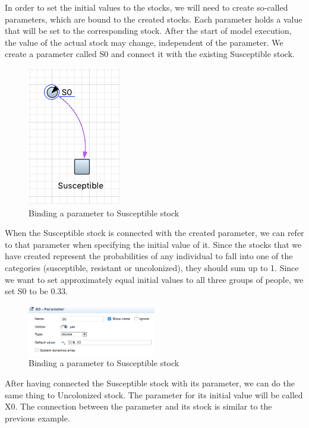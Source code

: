 In order to set the initial values to the stocks, we will need to create so-called parameters, which are bound to the created stocks. Each parameter holds a value that will be set to the corresponding stock. After the start of model execution, the value of the actual stock may change, independent of the parameter. We create a parameter called S0 and connect it with the existing Susceptible stock.

\begin{figure}[!ht]
  \centering
  \includegraphics[height=0.3\textwidth]{img/screens/basic/basic8}
  \caption{Binding a parameter to Susceptible stock}
\end{figure}

When the Susceptible stock is connected with the created parameter, we can refer to that parameter when specifying the initial value of it. Since the stocks that we have created represent the probabilities of any individual to fall into one of the categories (susceptible, resistant or uncolonized), they should sum up to 1. Since we want to set approximately equal initial values to all three groups of people, we set S0 to be 0.33.

\begin{figure}[!ht]
  \centering
  \includegraphics[width=0.5\textwidth]{img/screens/basic/basic7}
  \caption{Binding a parameter to Susceptible stock}
\end{figure}

After having connected the Susceptible stock with its parameter, we can do the same thing to Uncolonized stock. The parameter for its initial value will be called X0. The connection between the parameter and its stock is similar to the previous example.

